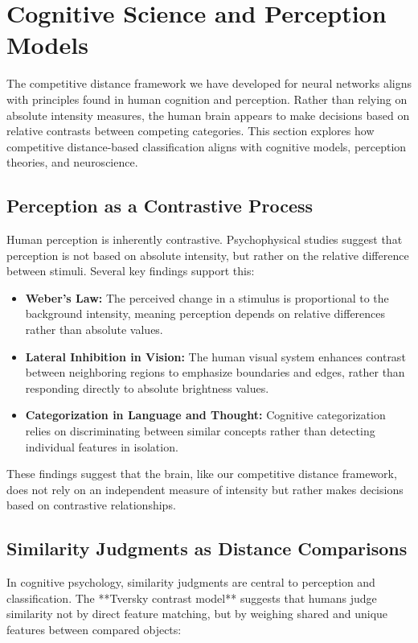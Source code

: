 \section{Cognitive Science and Perception Models}

The competitive distance framework we have developed for neural networks aligns with principles found in human cognition and perception. Rather than relying on absolute intensity measures, the human brain appears to make decisions based on relative contrasts between competing categories. This section explores how competitive distance-based classification aligns with cognitive models, perception theories, and neuroscience.

\subsection{Perception as a Contrastive Process}

Human perception is inherently contrastive. Psychophysical studies suggest that perception is not based on absolute intensity, but rather on the relative difference between stimuli. Several key findings support this:

\begin{itemize}
    \item \textbf{Weber’s Law:} The perceived change in a stimulus is proportional to the background intensity, meaning perception depends on relative differences rather than absolute values.
    \item \textbf{Lateral Inhibition in Vision:} The human visual system enhances contrast between neighboring regions to emphasize boundaries and edges, rather than responding directly to absolute brightness values.
    \item \textbf{Categorization in Language and Thought:} Cognitive categorization relies on discriminating between similar concepts rather than detecting individual features in isolation.
\end{itemize}

These findings suggest that the brain, like our competitive distance framework, does not rely on an independent measure of intensity but rather makes decisions based on contrastive relationships.

\subsection{Similarity Judgments as Distance Comparisons}

In cognitive psychology, similarity judgments are central to perception and classification. The **Tversky contrast model** \cite{tversky1977features} suggests that humans judge similarity not by direct feature matching, but by weighing shared and unique features between compared objects:

